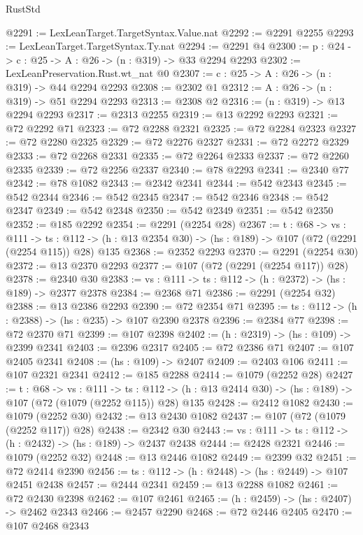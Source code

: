 \begin{lexlean}{RustStd}
\begin{coremodule}
{\begin{coremodule}
{{{{@2291 := LexLeanTarget.TargetSyntax.Value.nat
@2292 := @2291 @2255
@2293 := LexLeanTarget.TargetSyntax.Ty.nat
@2294 := @2291 @4
@2300 := {p : @24} -> {c : @25} -> {A : @26} -> (n : @319) -> @33 @2294 @2293
@2302 := LexLeanPreservation.Rust.wt_nat @0
@2307 := {c : @25} -> {A : @26} -> (n : @319) -> @44 @2294 @2293
@2308 := @2302 @1
@2312 := {A : @26} -> (n : @319) -> @51 @2294 @2293
@2313 := @2308 @2
@2316 := (n : @319) -> @13 @2294 @2293
@2317 := @2313 @2255
@2319 := @13 @2292 @2293
@2321 := @72 @2292 @71
@2323 := @72 @2288 @2321
@2325 := @72 @2284 @2323
@2327 := @72 @2280 @2325
@2329 := @72 @2276 @2327
@2331 := @72 @2272 @2329
@2333 := @72 @2268 @2331
@2335 := @72 @2264 @2333
@2337 := @72 @2260 @2335
@2339 := @72 @2256 @2337
@2340 := @78 @2293
@2341 := @2340 @77
@2342 := @78 @1082
@2343 := @2342 @2341
@2344 := @542 @2343
@2345 := @542 @2344
@2346 := @542 @2345
@2347 := @542 @2346
@2348 := @542 @2347
@2349 := @542 @2348
@2350 := @542 @2349
@2351 := @542 @2350
@2352 := @185 @2292
@2354 := @2291 (@2254 @28)
@2367 := {t : @68} ->
  {vs : @111} ->
  {ts : @112} -> (h : @13 @2354 @30) -> (hs : @189) -> @107 (@72 (@2291 (@2254 @115)) @28) @135
@2368 := @2352 @2293
@2370 := @2291 (@2254 @30)
@2372 := @13 @2370 @2293
@2377 := @107 (@72 (@2291 (@2254 @117)) @28)
@2378 := @2340 @30
@2383 := {vs : @111} -> {ts : @112} -> (h : @2372) -> (hs : @189) -> @2377 @2378
@2384 := @2368 @71
@2386 := @2291 (@2254 @32)
@2388 := @13 @2386 @2293
@2390 := @72 @2354 @71
@2395 := {ts : @112} -> (h : @2388) -> (hs : @235) -> @107 @2390 @2378
@2396 := @2384 @77
@2398 := @72 @2370 @71
@2399 := @107 @2398
@2402 := (h : @2319) -> (hs : @109) -> @2399 @2341
@2403 := @2396 @2317
@2405 := @72 @2386 @71
@2407 := @107 @2405 @2341
@2408 := (hs : @109) -> @2407
@2409 := @2403 @106
@2411 := @107 @2321 @2341
@2412 := @185 @2288
@2414 := @1079 (@2252 @28)
@2427 := {t : @68} ->
  {vs : @111} ->
  {ts : @112} -> (h : @13 @2414 @30) -> (hs : @189) -> @107 (@72 (@1079 (@2252 @115)) @28) @135
@2428 := @2412 @1082
@2430 := @1079 (@2252 @30)
@2432 := @13 @2430 @1082
@2437 := @107 (@72 (@1079 (@2252 @117)) @28)
@2438 := @2342 @30
@2443 := {vs : @111} -> {ts : @112} -> (h : @2432) -> (hs : @189) -> @2437 @2438
@2444 := @2428 @2321
@2446 := @1079 (@2252 @32)
@2448 := @13 @2446 @1082
@2449 := @2399 @32
@2451 := @72 @2414 @2390
@2456 := {ts : @112} -> (h : @2448) -> (hs : @2449) -> @107 @2451 @2438
@2457 := @2444 @2341
@2459 := @13 @2288 @1082
@2461 := @72 @2430 @2398
@2462 := @107 @2461
@2465 := (h : @2459) -> (hs : @2407) -> @2462 @2343
@2466 := @2457 @2290
@2468 := @72 @2446 @2405
@2470 := @107 @2468 @2343
}}}}
\end{coremodule}}
\end{coremodule}
\end{lexlean}
